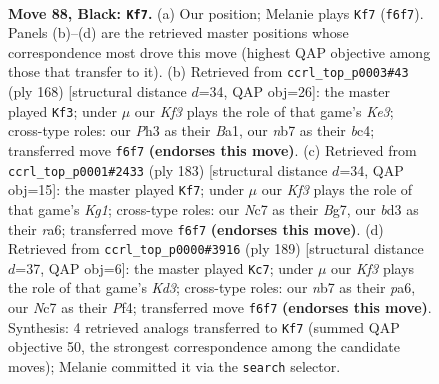 \documentclass[11pt]{article}
\begin{document}
\clearpage

\begin{figure}[p]\centering
\begin{subfigure}{0.46\textwidth}\centering
\resizebox{\linewidth}{!}{%
\newchessgame
\chessboard[
  setfen={8/1Nn5/5k2/p7/Pb1pP2n/1P1B3p/1K2P3/8 b - - 43 88},
  showmover=false,
  pgfstyle=straightmove, color=movearrow, markmove={f6-f7}
]}
\caption{}
\end{subfigure}\hfill
\begin{subfigure}{0.46\textwidth}\centering
\resizebox{\linewidth}{!}{%
\newchessgame
\chessboard[
  setfen={6k1/1B3p2/Pb4p1/2p1P2p/2b4P/4K1P1/8/B7 w - - 45 85},
  showmover=false,
  pgfstyle=straightmove, color=movearrow, markmove={e3-f3}
]}
\caption{}
\end{subfigure}
\\[4pt]
\begin{subfigure}{0.46\textwidth}\centering
\resizebox{\linewidth}{!}{%
\newchessgame
\chessboard[
  setfen={6k1/6b1/R5p1/5pPp/1r3P1P/4B3/5PK1/8 b - - 48 92},
  showmover=false,
  pgfstyle=straightmove, color=movearrow, markmove={g8-f7}
]}
\caption{}
\end{subfigure}\hfill
\begin{subfigure}{0.46\textwidth}\centering
\resizebox{\linewidth}{!}{%
\newchessgame
\chessboard[
  setfen={8/p7/P1Bk1p2/1P6/5pPp/5P1K/5b2/8 b - - 9 95},
  showmover=false,
  pgfstyle=straightmove, color=movearrow, markmove={d6-c7}
]}
\caption{}
\end{subfigure}
\caption{\textbf{Move 88, Black: \texttt{Kf7}.} (a) Our position; Melanie plays \texttt{Kf7} (\texttt{f6f7}). Panels (b)--(d) are the retrieved master positions whose correspondence most drove this move (highest QAP objective among those that transfer to it). (b) Retrieved from \texttt{ccrl\_top\_p0003\#43} (ply 168) [structural distance $d$=34, QAP obj=26]: the master played \texttt{Kf3}; under $\mu$ our \emph{Kf3} plays the role of that game's \emph{Ke3}; cross-type roles: our \emph{P}h3 as their \emph{B}a1, our \emph{n}b7 as their \emph{b}c4; transferred move \texttt{f6f7} \textbf{(endorses this move)}. (c) Retrieved from \texttt{ccrl\_top\_p0001\#2433} (ply 183) [structural distance $d$=34, QAP obj=15]: the master played \texttt{Kf7}; under $\mu$ our \emph{Kf3} plays the role of that game's \emph{Kg1}; cross-type roles: our \emph{N}c7 as their \emph{B}g7, our \emph{b}d3 as their \emph{r}a6; transferred move \texttt{f6f7} \textbf{(endorses this move)}. (d) Retrieved from \texttt{ccrl\_top\_p0000\#3916} (ply 189) [structural distance $d$=37, QAP obj=6]: the master played \texttt{Kc7}; under $\mu$ our \emph{Kf3} plays the role of that game's \emph{Kd3}; cross-type roles: our \emph{n}b7 as their \emph{p}a6, our \emph{N}c7 as their \emph{P}f4; transferred move \texttt{f6f7} \textbf{(endorses this move)}. Synthesis: 4 retrieved analogs transferred to \texttt{Kf7} (summed QAP objective 50, the strongest correspondence among the candidate moves); Melanie committed it via the \texttt{search} selector.}
\label{fig:thought-m175}
\end{figure}
\end{document}
